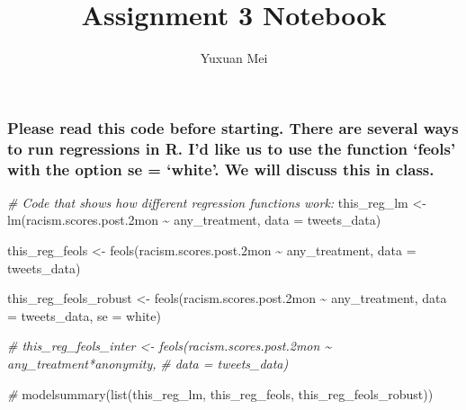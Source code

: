 \documentclass[
]{article}
\title{Assignment 3 Notebook}
\author{Yuxuan Mei}
\date{}
\newenvironment{Shaded}{\begin{snugshade}}{\end{snugshade}}
\newcommand{\AttributeTok}[1]{\textcolor[rgb]{0.77,0.63,0.00}{#1}}
\newcommand{\CommentTok}[1]{\textcolor[rgb]{0.56,0.35,0.01}{\textit{#1}}}
\newcommand{\FloatTok}[1]{\textcolor[rgb]{0.00,0.00,0.81}{#1}}
\newcommand{\FunctionTok}[1]{\textcolor[rgb]{0.00,0.00,0.00}{#1}}
\newcommand{\NormalTok}[1]{#1}
\newcommand{\OtherTok}[1]{\textcolor[rgb]{0.56,0.35,0.01}{#1}}
\newcommand{\SpecialCharTok}[1]{\textcolor[rgb]{0.00,0.00,0.00}{#1}}
\newcommand{\StringTok}[1]{\textcolor[rgb]{0.31,0.60,0.02}{#1}}
\begin{document}
\maketitle

\hypertarget{please-read-this-code-before-starting.-there-are-several-ways-to-run-regressions-in-r.-id-like-us-to-use-the-function-feols-with-the-option-se-white.-we-will-discuss-this-in-class.}{%
\subsubsection{Please read this code before starting. There are several
ways to run regressions in R. I'd like us to use the function `feols'
with the option se = `white'. We will discuss this in
class.}\label{please-read-this-code-before-starting.-there-are-several-ways-to-run-regressions-in-r.-id-like-us-to-use-the-function-feols-with-the-option-se-white.-we-will-discuss-this-in-class.}}

\begin{Shaded}
\begin{Highlighting}[]
\CommentTok{\# Code that shows how different regression functions work:}
\NormalTok{this\_reg\_lm }\OtherTok{\textless{}{-}} \FunctionTok{lm}\NormalTok{(racism.scores.post}\FloatTok{.2}\NormalTok{mon }\SpecialCharTok{\textasciitilde{}}\NormalTok{ any\_treatment, }
                  \AttributeTok{data =}\NormalTok{ tweets\_data)}

\NormalTok{this\_reg\_feols }\OtherTok{\textless{}{-}} \FunctionTok{feols}\NormalTok{(racism.scores.post}\FloatTok{.2}\NormalTok{mon }\SpecialCharTok{\textasciitilde{}}\NormalTok{ any\_treatment, }
                        \AttributeTok{data =}\NormalTok{ tweets\_data)}

\NormalTok{this\_reg\_feols\_robust }\OtherTok{\textless{}{-}} \FunctionTok{feols}\NormalTok{(racism.scores.post}\FloatTok{.2}\NormalTok{mon }\SpecialCharTok{\textasciitilde{}}\NormalTok{ any\_treatment, }
                               \AttributeTok{data =}\NormalTok{ tweets\_data, }\AttributeTok{se =} \StringTok{\textquotesingle{}white\textquotesingle{}}\NormalTok{)}

\CommentTok{\# this\_reg\_feols\_inter \textless{}{-} feols(racism.scores.post.2mon \textasciitilde{} any\_treatment*anonymity, }
\CommentTok{\#                               data = tweets\_data)}

\CommentTok{\# }
\FunctionTok{modelsummary}\NormalTok{(}\FunctionTok{list}\NormalTok{(this\_reg\_lm, this\_reg\_feols, this\_reg\_feols\_robust))}
\end{Highlighting}
\end{Shaded}
\end{document}
